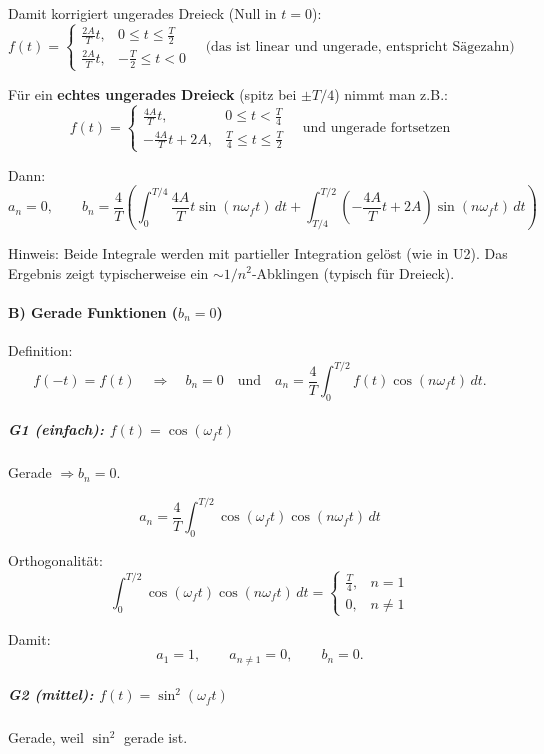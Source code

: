 Damit korrigiert ungerades Dreieck (Null in $t=0$):
\[
f(t)=
\begin{cases}
\frac{2A}{T}t, & 0\le t\le \frac{T}{2}\\[4pt]
\frac{2A}{T}t, & -\frac{T}{2}\le t<0
\end{cases}
\quad \text{(das ist linear und ungerade, entspricht Sägezahn)}
\]

Für ein \textbf{echtes ungerades Dreieck} (spitz bei $\pm T/4$) nimmt man z.B.:
\[
f(t)=
\begin{cases}
\frac{4A}{T}t, & 0\le t<\frac{T}{4}\\[4pt]
-\frac{4A}{T}t+2A, & \frac{T}{4}\le t\le \frac{T}{2}
\end{cases}
\quad \text{und ungerade fortsetzen}
\]

Dann:
\[
a_n=0,\qquad
b_n=\frac{4}{T}\left(
\int_0^{T/4}\frac{4A}{T}t\sin(n\omega_f t)\,dt
+
\int_{T/4}^{T/2}\left(-\frac{4A}{T}t+2A\right)\sin(n\omega_f t)\,dt
\right)
\]

Hinweis: Beide Integrale werden mit partieller Integration gelöst (wie in U2).
Das Ergebnis zeigt typischerweise ein $\sim 1/n^2$-Abklingen (typisch für Dreieck).

\paragraph{B) Gerade Funktionen ($b_n = 0$)}

Definition:
\[
f(-t)=f(t)
\quad\Rightarrow\quad
\boxed{b_n=0}
\quad\text{und}\quad
a_n=\frac{4}{T}\int_0^{T/2} f(t)\cos(n\omega_f t)\,dt.
\]

\subparagraph{G1 (einfach): $f(t)=\cos(\omega_f t)$}

Gerade $\Rightarrow b_n=0$.

\[
a_n=\frac{4}{T}\int_0^{T/2}\cos(\omega_f t)\cos(n\omega_f t)\,dt
\]

Orthogonalität:
\[
\int_0^{T/2}\cos(\omega_f t)\cos(n\omega_f t)\,dt=
\begin{cases}
\frac{T}{4}, & n=1\\
0, & n\neq 1
\end{cases}
\]

Damit:
\[
\boxed{a_1=1},\qquad \boxed{a_{n\neq 1}=0},\qquad \boxed{b_n=0}.
\]

\subparagraph{G2 (mittel): $f(t)=\sin^2(\omega_f t)$}

Gerade, weil $\sin^2$ gerade ist.


